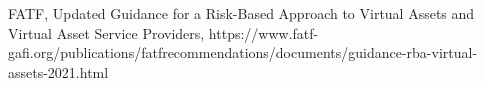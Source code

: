 


\begin{thebibliography}{9}
 FATF, Updated Guidance for a Risk-Based Approach to Virtual Assets and Virtual Asset Service Providers, 
https://www.fatf-gafi.org/publications/fatfrecommendations/documents/guidance-rba-virtual-assets-2021.html

\end{thebibliography}